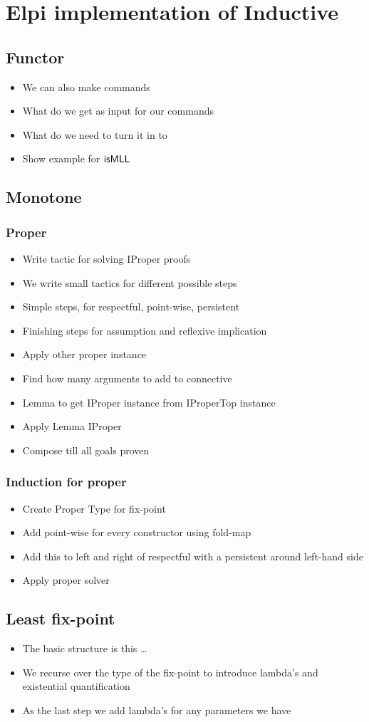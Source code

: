 \documentclass[thesis.tex]{subfiles}
\begin{document}
\chapter{Elpi implementation of Inductive}
\section{Functor}

\begin{itemize}
    \item We can also make commands
    \item What do we get as input for our commands
    \item What do we need to turn it in to
    \item Show example for $\textsf{\upshape isMLL}$
\end{itemize}

\section{Monotone}
\subsection{Proper}
\begin{itemize}
    \item Write tactic for solving IProper proofs
    \item We write small tactics for different possible steps
    \item Simple steps, for respectful, point-wise, persistent
    \item Finishing steps for assumption and reflexive implication
    \item Apply other proper instance
    \item Find how many arguments to add to connective
    \item Lemma to get IProper instance from IProperTop instance
    \item Apply Lemma IProper
    \item Compose till all goals proven
\end{itemize}

\subsection{Induction for proper}
\begin{itemize}
    \item Create Proper Type for fix-point
    \item Add point-wise for every constructor using fold-map
    \item Add this to left and right of respectful with a persistent around left-hand side
    \item Apply proper solver
\end{itemize}

\section{Least fix-point}
\begin{itemize}
    \item The basic structure is this \dots
    \item We recurse over the type of the fix-point to introduce lambda's and existential quantification
    \item As the last step we add lambda's for any parameters we have
\end{itemize}
\end{document}
